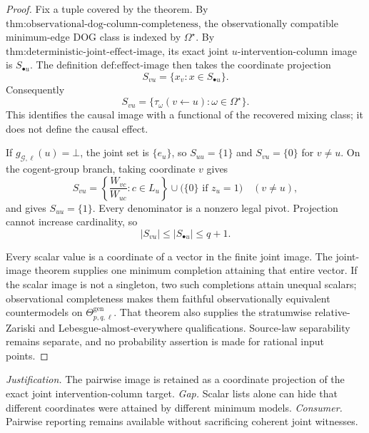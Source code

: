 \documentclass{article}
\begin{document}
\begin{proof}
Fix a tuple covered by the theorem. By \(\text{thm:observational-dog-column-completeness}\), the observationally compatible minimum-edge DOG class is indexed by \(\Omega^\star\). By \(\text{thm:deterministic-joint-effect-image}\), its exact joint \(u\)-intervention-column image is \(S_{\bullet u}\). The definition \(\text{def:effect-image}\) then takes the coordinate projection
\[
S_{vu}=\{x_v:x\in S_{\bullet u}\}.
\]
Consequently
\[
S_{vu}=\{\tau_\omega(v\leftarrow u):\omega\in\Omega^\star\}.
\]
This identifies the causal image with a functional of the recovered mixing class; it does not define the causal effect.

If \(g_{\mathcal G,\ell}(u)=\bot\), the joint set is \(\{e_u\}\), so \(S_{uu}=\{1\}\) and \(S_{vu}=\{0\}\) for \(v\ne u\). On the cogent-group branch, taking coordinate \(v\) gives
\[
S_{vu}=\left\{\frac{W_{vc}}{W_{uc}}:c\in L_u\right\}
\cup\bigl(\{0\}\text{ if }z_u=1\bigr)\quad(v\ne u),
\]
and gives \(S_{uu}=\{1\}\). Every denominator is a nonzero legal pivot. Projection cannot increase cardinality, so
\[
|S_{vu}|\le |S_{\bullet u}|\le q+1.
\]

Every scalar value is a coordinate of a vector in the finite joint image. The joint-image theorem supplies one minimum completion attaining that entire vector. If the scalar image is not a singleton, two such completions attain unequal scalars; observational completeness makes them faithful observationally equivalent countermodels on \(\Theta_{p,q,\ell}^{\mathrm{gen}}\). That theorem also supplies the stratumwise relative-Zariski and Lebesgue-almost-everywhere qualifications. Source-law separability remains separate, and no probability assertion is made for rational input points.
\end{proof}
\par\smallskip\noindent \textit{Justification.} The pairwise image is retained as a coordinate projection of the exact joint intervention-column target. \textit{Gap.} Scalar lists alone can hide that different coordinates were attained by different minimum models. \textit{Consumer.} Pairwise reporting remains available without sacrificing coherent joint witnesses.
\end{document}
